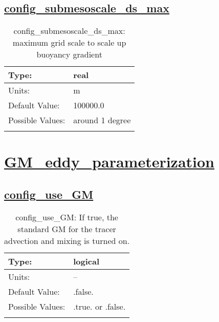 \subsection[config\_submesoscale\_ds\_max]{\hyperref[sec:nm_tab_submesoscale_eddy_parameterization]{config\_submesoscale\_ds\_max}}
\label{subsec:nm_sec_config_submesoscale_ds_max}
\begin{center}
\begin{longtable}{| p{2.0in} || p{4.0in} |}
    \hline
    Type: & real \\
    \hline
    Units: & \si{m} \\
    \hline
    Default Value: & 100000.0 \\
    \hline
    Possible Values: & around 1 degree \\
    \hline
    \caption{config\_submesoscale\_ds\_max: maximum grid scale to scale up buoyancy gradient}
\end{longtable}
\end{center}
\section[GM\_eddy\_parameterization]{\hyperref[sec:nm_tab_GM_eddy_parameterization]{GM\_eddy\_parameterization}}
\label{sec:nm_sec_GM_eddy_parameterization}
\subsection[config\_use\_GM]{\hyperref[sec:nm_tab_GM_eddy_parameterization]{config\_use\_GM}}
\label{subsec:nm_sec_config_use_GM}
\begin{center}
\begin{longtable}{| p{2.0in} || p{4.0in} |}
    \hline
    Type: & logical \\
    \hline
    Units: & -- \\
    \hline
    Default Value: & .false. \\
    \hline
    Possible Values: & .true. or .false. \\
    \hline
    \caption{config\_use\_GM: If true, the standard GM for the tracer advection and mixing is turned on.}
\end{longtable}
\end{center}
